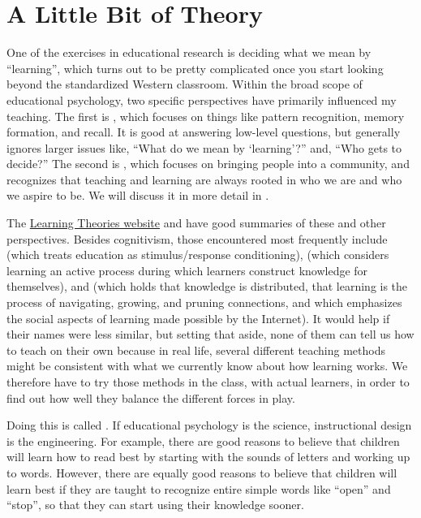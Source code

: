 \chapter{A Little Bit of Theory}\label{s:theory}

One of the exercises in educational research is deciding what we mean
by ``learning'', which turns out to be pretty complicated once you
start looking beyond the standardized Western classroom.  Within the
broad scope of educational psychology, two specific perspectives have
primarily influenced my teaching.  The first is
, which focuses on things like
pattern recognition, memory formation, and recall. It is good at
answering low-level questions, but generally ignores larger issues
like, ``What do we mean by `learning'?'' and, ``Who gets to decide?''
The second is , which
focuses on bringing people into a community, and recognizes that
teaching and learning are always rooted in who we are and who we
aspire to be.  We will discuss it in more detail in
.

The \href{http://www.learning-theories.com/}{Learning Theories
  website} and \cite{Wibu2016} have good summaries of these and other
perspectives.  Besides cognitivism, those encountered most frequently
include  (which treats education
as stimulus/response conditioning),
 (which considers learning
an active process during which learners construct knowledge for
themselves), and  (which holds
that knowledge is distributed, that learning is the process of
navigating, growing, and pruning connections, and which emphasizes the
social aspects of learning made possible by the Internet). It would
help if their names were less similar, but setting that aside, none of
them can tell us how to teach on their own because in real life,
several different teaching methods might be consistent with what we
currently know about how learning works. We therefore have to try
those methods in the class, with actual learners, in order to find out
how well they balance the different forces in play.

Doing this is called . If educational psychology is the science, instructional
design is the engineering. For example, there are good reasons to
believe that children will learn how to read best by starting with the
sounds of letters and working up to words. However, there are equally
good reasons to believe that children will learn best if they are
taught to recognize entire simple words like ``open'' and ``stop'', so
that they can start using their knowledge sooner.

